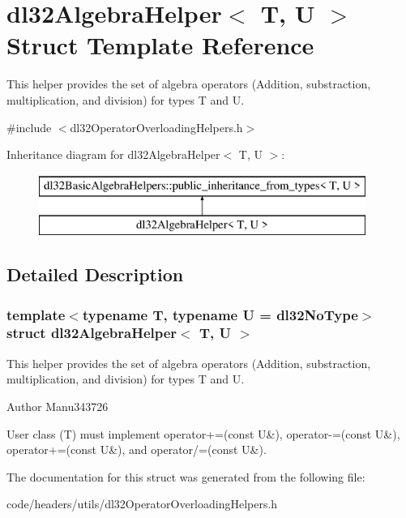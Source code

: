 \hypertarget{structdl32_algebra_helper}{\section{dl32\-Algebra\-Helper$<$ T, U $>$ Struct Template Reference}
\label{structdl32_algebra_helper}
}


This helper provides the set of algebra operators (Addition, substraction, multiplication, and division) for types T and U.  




{\ttfamily \#include $<$dl32\-Operator\-Overloading\-Helpers.\-h$>$}

Inheritance diagram for dl32\-Algebra\-Helper$<$ T, U $>$\-:\begin{figure}[H]
\begin{center}
\leavevmode
\includegraphics[height=2.000000cm]{structdl32_algebra_helper}
\end{center}
\end{figure}


\subsection{Detailed Description}
\subsubsection*{template$<$typename T, typename U = dl32\-No\-Type$>$struct dl32\-Algebra\-Helper$<$ T, U $>$}

This helper provides the set of algebra operators (Addition, substraction, multiplication, and division) for types T and U. 

\begin{DoxyAuthor}{Author}
Manu343726
\end{DoxyAuthor}
User class (T) must implement operator+=(const U\&), operator-\/=(const U\&), operator+=(const U\&), and operator/=(const U\&). 

The documentation for this struct was generated from the following file\-:\begin{DoxyCompactItemize}
\item 
code/headers/utils/dl32\-Operator\-Overloading\-Helpers.\-h\end{DoxyCompactItemize}
